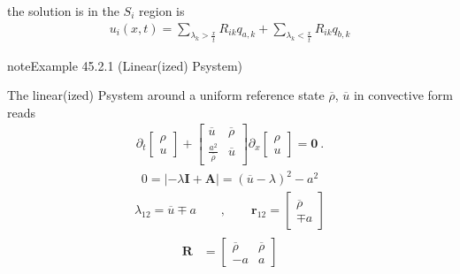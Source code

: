\documentclass[letterpaper,10pt,english]{jupyterBook}
\begin{document}
\sphinxAtStartPar
the solution is in the \(S_i\) region is
\begin{equation*}
\begin{split}u_i(x,t) = \sum_{\lambda_k > \frac{x}{t}} R_{ik} q_{a,k} +  \sum_{\lambda_k < \frac{x}{t}} R_{ik} q_{b,k}\end{split}
\end{equation*}\label{ch/pde/hyperbolic-dimensions:example-0}
\begin{sphinxadmonition}{note}{Example 45.2.1 (Linear(ized) P\sphinxhyphen{}system)}



\sphinxAtStartPar
The linear(ized) P\sphinxhyphen{}system around a uniform reference state \(\overline{\rho}\), \(\overline{u}\) in convective form reads
\begin{equation*}
\begin{split}
  \partial_t \begin{bmatrix} \rho \\ u \end{bmatrix} + \begin{bmatrix} \overline{u} & \overline{\rho} \\ \frac{a^2}{\overline{\rho}} & \overline{u} \end{bmatrix} \partial_x \begin{bmatrix} \rho \\ u \end{bmatrix} = \mathbf{0} \ .
\end{split}
\end{equation*}
\sphinxAtStartPar
{}
\begin{equation*}
\begin{split}0 = \left| -\lambda \mathbf{I} + \mathbf{A} \right| = (\overline{u}-\lambda)^2 - a^2\end{split}
\end{equation*}\begin{equation*}
\begin{split}\lambda_{12} = \overline{u} \mp a \qquad , \qquad \mathbf{r}_{12} = \begin{bmatrix} \overline{\rho} \\ \mp a \end{bmatrix} \end{split}
\end{equation*}\begin{equation*}
\begin{split}\begin{aligned}
  \mathbf{R} & = \begin{bmatrix} \overline{\rho} & \overline{\rho} \\ - a & a \end{bmatrix} \\

\end{aligned}
\end{split}
\end{equation*}
\end{sphinxadmonition}
\end{document}
